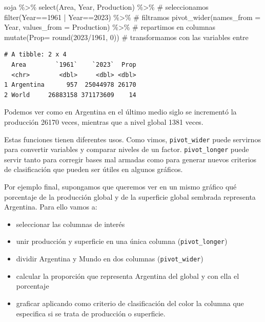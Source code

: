 \documentclass[
  letterpaper,
  DIV=11,
  numbers=noendperiod]{scrartcl}
\newenvironment{Shaded}{\begin{snugshade}}{\end{snugshade}}
\newcommand{\AttributeTok}[1]{\textcolor[rgb]{0.40,0.45,0.13}{#1}}
\newcommand{\CommentTok}[1]{\textcolor[rgb]{0.37,0.37,0.37}{#1}}
\newcommand{\DecValTok}[1]{\textcolor[rgb]{0.68,0.00,0.00}{#1}}
\newcommand{\FunctionTok}[1]{\textcolor[rgb]{0.28,0.35,0.67}{#1}}
\newcommand{\NormalTok}[1]{\textcolor[rgb]{0.00,0.23,0.31}{#1}}
\newcommand{\SpecialCharTok}[1]{\textcolor[rgb]{0.37,0.37,0.37}{#1}}
\newcommand{\StringTok}[1]{\textcolor[rgb]{0.13,0.47,0.30}{#1}}
\providecommand{\tightlist}{%
  \setlength{\itemsep}{0pt}\setlength{\parskip}{0pt}}\usepackage{longtable,booktabs,array}
\begin{document}
\begin{Shaded}
\begin{Highlighting}[]
\NormalTok{soja }\SpecialCharTok{\%\textgreater{}\%} \FunctionTok{select}\NormalTok{(Area, Year, Production) }\SpecialCharTok{\%\textgreater{}\%} \CommentTok{\# seleccionamos}
  \FunctionTok{filter}\NormalTok{(Year}\SpecialCharTok{==}\DecValTok{1961} \SpecialCharTok{|}\NormalTok{ Year}\SpecialCharTok{==}\DecValTok{2023}\NormalTok{) }\SpecialCharTok{\%\textgreater{}\%}  \CommentTok{\# filtramos}
  \FunctionTok{pivot\_wider}\NormalTok{(}\AttributeTok{names\_from =}\NormalTok{  Year, }\AttributeTok{values\_from =}\NormalTok{ Production) }\SpecialCharTok{\%\textgreater{}\%} \CommentTok{\# repartimos en columnas}
  \FunctionTok{mutate}\NormalTok{(}\AttributeTok{Prop=} \FunctionTok{round}\NormalTok{(}\StringTok{\textasciigrave{}}\AttributeTok{2023}\StringTok{\textasciigrave{}}\SpecialCharTok{/}\StringTok{\textasciigrave{}}\AttributeTok{1961}\StringTok{\textasciigrave{}}\NormalTok{, }\DecValTok{0}\NormalTok{)) }\CommentTok{\# transformamos con las variables entre \textasciigrave{} \textasciigrave{}}
\end{Highlighting}
\end{Shaded}

\begin{verbatim}
# A tibble: 2 x 4
  Area        `1961`    `2023`  Prop
  <chr>        <dbl>     <dbl> <dbl>
1 Argentina      957  25044978 26170
2 World     26883158 371173609    14
\end{verbatim}

Podemos ver como en Argentina en el último medio siglo se incrementó la
producción 26170 veces, mientras que a nivel global 1381 veces.

Estas funciones tienen diferentes usos. Como vimos,
\texttt{pivot\_wider} puede servirnos para convertir variables y
comparar niveles de un factor. \texttt{pivot\_longer} puede servir tanto
para corregir bases mal armadas como para generar nuevos criterios de
clasificación que pueden ser útiles en algunos gráficos.

Por ejemplo final, supongamos que queremos ver en un mismo gráfico qué
porcentaje de la producción global y de la superficie global sembrada
representa Argentina. Para ello vamos a:

\begin{itemize}
\tightlist
\item
  seleccionar las columnas de interés
\item
  unir producción y superficie en una única columna
  (\texttt{pivot\_longer})
\item
  dividir Argentina y Mundo en dos columnas (\texttt{pivot\_wider})
\item
  calcular la proporción que representa Argentina del global y con ella
  el porcentaje
\item
  graficar aplicando como criterio de clasificación del color la columna
  que especifica si se trata de producción o superficie.
\end{itemize}
\end{document}
